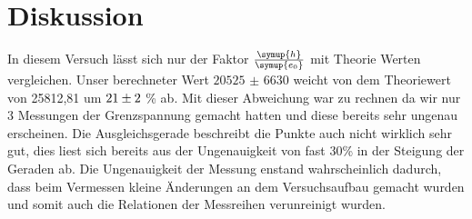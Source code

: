 \section{Diskussion}
    In diesem Versuch lässt sich nur der Faktor $\frac{\symup{h}}{\symup{e_0}}$ mit Theorie Werten vergleichen.
    Unser berechneter Wert $\num{20525(6630)}$ weicht von dem Theoriewert von 25812,81 um $\num{21 (2)}$ \% ab.
    Mit dieser Abweichung war zu rechnen da wir nur 3 Messungen der Grenzspannung gemacht hatten und diese bereits sehr ungenau erscheinen.
    Die Ausgleichsgerade beschreibt die Punkte auch nicht wirklich sehr gut, dies liest sich bereits aus der Ungenauigkeit von fast 30\% in der 
    Steigung der Geraden ab. Die Ungenauigkeit der Messung enstand wahrscheinlich dadurch, dass beim Vermessen kleine Änderungen an dem 
    Versuchsaufbau gemacht wurden und somit auch die Relationen der Messreihen verunreinigt wurden. 